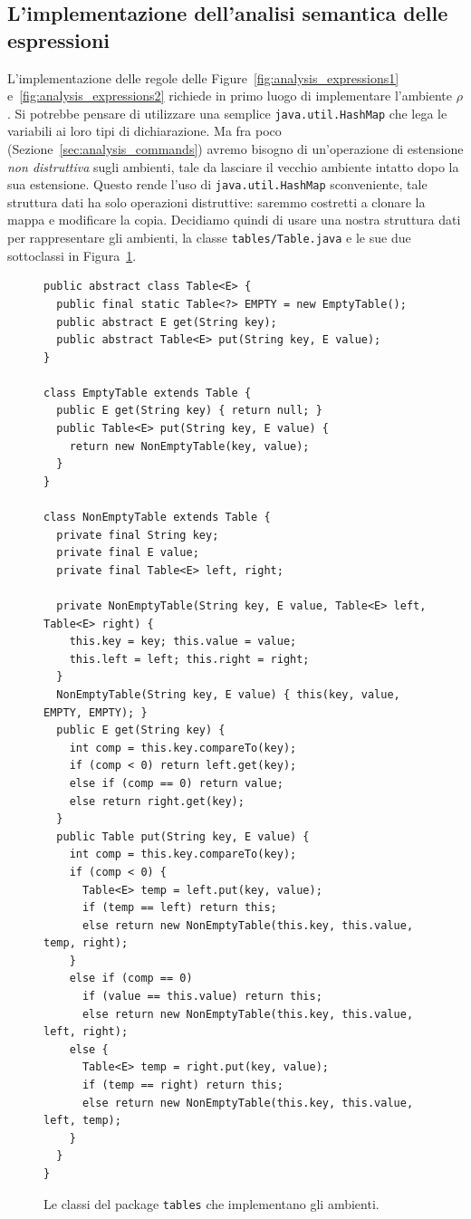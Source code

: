 \subsection{L'implementazione dell'analisi semantica delle espressioni}
  \label{subsec:analysis_expressions_implementation}
%
L'implementazione delle regole delle Figure~\ref{fig:analysis_expressions1}
e~\ref{fig:analysis_expressions2}
richiede in primo luogo di implementare l'ambiente $\rho$. Si potrebbe
pensare di utilizzare una semplice \texttt{java.util.HashMap} che lega
le variabili ai loro tipi di dichiarazione. Ma fra poco
(Sezione~\ref{sec:analysis_commands}) avremo bisogno di
un'operazione di estensione \emph{non distruttiva} sugli ambienti, tale
\cioe da lasciare il vecchio ambiente intatto dopo la sua estensione.
Questo rende l'uso di \texttt{java.util.HashMap} sconveniente, \poiche
tale struttura dati ha solo operazioni distruttive: saremmo
costretti a clonare la mappa e modificare la copia.
Decidiamo quindi di usare una nostra struttura dati
per rappresentare gli ambienti, \cioe la classe \texttt{tables/Table.java}
e le sue due sottoclassi in Figura~\ref{fig:symbol.Table}.
%
\begin{figure}
{\small
\begin{verbatim}
public abstract class Table<E> {
  public final static Table<?> EMPTY = new EmptyTable();
  public abstract E get(String key);
  public abstract Table<E> put(String key, E value);
}

class EmptyTable extends Table {
  public E get(String key) { return null; }
  public Table<E> put(String key, E value) {
    return new NonEmptyTable(key, value);
  }
}

class NonEmptyTable extends Table {
  private final String key;
  private final E value;
  private final Table<E> left, right;

  private NonEmptyTable(String key, E value, Table<E> left, Table<E> right) {
    this.key = key; this.value = value;
    this.left = left; this.right = right;
  }
  NonEmptyTable(String key, E value) { this(key, value, EMPTY, EMPTY); }
  public E get(String key) {
    int comp = this.key.compareTo(key);
    if (comp < 0) return left.get(key);
    else if (comp == 0) return value;
    else return right.get(key);
  }
  public Table put(String key, E value) {
    int comp = this.key.compareTo(key);
    if (comp < 0) {
      Table<E> temp = left.put(key, value);
      if (temp == left) return this;
      else return new NonEmptyTable(this.key, this.value, temp, right);
    } 
    else if (comp == 0)
      if (value == this.value) return this;
      else return new NonEmptyTable(this.key, this.value, left, right);
    else {
      Table<E> temp = right.put(key, value);
      if (temp == right) return this;
      else return new NonEmptyTable(this.key, this.value, left, temp);
    }
  }
}
\end{verbatim}
}
\caption{Le classi del package \texttt{tables} che implementano gli ambienti.}
  \label{fig:symbol.Table}
\end{figure}

